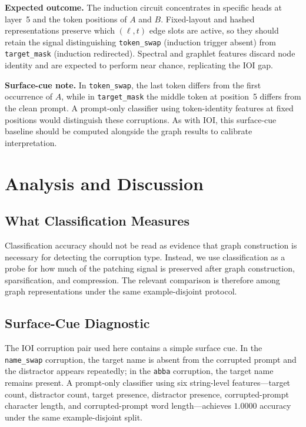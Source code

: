 \documentclass[11pt,a4paper]{article}
\begin{document}
\textbf{Expected outcome.} The induction circuit concentrates in specific heads at layer~5 and the token positions of $A$ and $B$. Fixed-layout and hashed representations preserve which $(\ell, t)$ edge slots are active, so they should retain the signal distinguishing \texttt{token\_swap} (induction trigger absent) from \texttt{target\_mask} (induction redirected). Spectral and graphlet features discard node identity and are expected to perform near chance, replicating the IOI gap.

\textbf{Surface-cue note.} In \texttt{token\_swap}, the last token differs from the first occurrence of $A$, while in \texttt{target\_mask} the middle token at position~5 differs from the clean prompt. A prompt-only classifier using token-identity features at fixed positions would distinguish these corruptions. As with IOI, this surface-cue baseline should be computed alongside the graph results to calibrate interpretation.

\section{Analysis and Discussion}

\subsection{What Classification Measures}

Classification accuracy should not be read as evidence that graph construction is necessary for detecting the corruption type. Instead, we use classification as a probe for how much of the patching signal is preserved after graph construction, sparsification, and compression. The relevant comparison is therefore among graph representations under the same example-disjoint protocol.

\subsection{Surface-Cue Diagnostic}
\label{sec:surface_cue_diagnostic}

The IOI corruption pair used here contains a simple surface cue. In the \texttt{name\_swap} corruption, the target name is absent from the corrupted prompt and the distractor appears repeatedly; in the \texttt{abba} corruption, the target name remains present. A prompt-only classifier using six string-level features---target count, distractor count, target presence, distractor presence, corrupted-prompt character length, and corrupted-prompt word length---achieves $1.0000$ accuracy under the same example-disjoint split.
\end{document}
